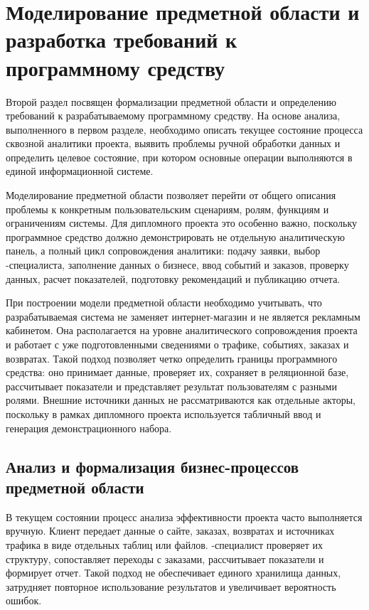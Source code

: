 \section{Моделирование предметной области и разработка требований к программному средству}

Второй раздел посвящен формализации предметной области и определению требований к разрабатываемому программному средству. На основе анализа, выполненного в первом разделе, необходимо описать текущее состояние процесса сквозной аналитики  проекта, выявить проблемы ручной обработки данных и определить целевое состояние, при котором основные операции выполняются в единой информационной системе.

Моделирование предметной области позволяет перейти от общего описания проблемы к конкретным пользовательским сценариям, ролям, функциям и ограничениям системы. Для дипломного проекта это особенно важно, поскольку программное средство должно демонстрировать не отдельную аналитическую панель, а полный цикл сопровождения аналитики: подачу заявки, выбор -специалиста, заполнение данных о бизнесе, ввод событий и заказов, проверку данных, расчет показателей, подготовку рекомендаций и публикацию отчета.

При построении модели предметной области необходимо учитывать, что разрабатываемая система не заменяет интернет-магазин и не является рекламным кабинетом. Она располагается на уровне аналитического сопровождения проекта и работает с уже подготовленными сведениями о трафике, событиях, заказах и возвратах. Такой подход позволяет четко определить границы программного средства: оно принимает данные, проверяет их, сохраняет в реляционной базе, рассчитывает показатели и представляет результат пользователям с разными ролями. Внешние источники данных не рассматриваются как отдельные акторы, поскольку в рамках дипломного проекта используется табличный ввод и генерация демонстрационного набора.

\subsection{Анализ и формализация бизнес-процессов предметной области}

В текущем состоянии процесс анализа эффективности  проекта часто выполняется вручную. Клиент передает данные о сайте, заказах, возвратах и источниках трафика в виде отдельных таблиц или файлов. -специалист проверяет их структуру, сопоставляет переходы с заказами, рассчитывает показатели и формирует отчет. Такой подход не обеспечивает единого хранилища данных, затрудняет повторное использование результатов и увеличивает вероятность ошибок.

